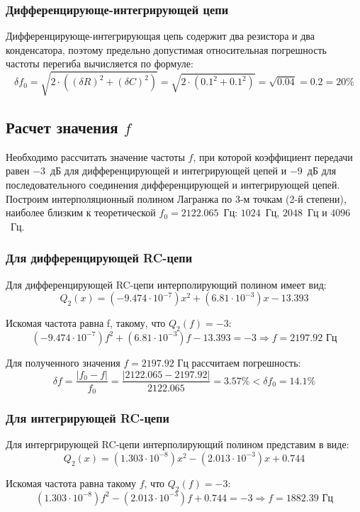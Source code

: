 \documentclass[a4paper,14pt]{extarticle}
\begin{document}
\subsubsection{Дифференцирующе-интегрирующей цепи}

Дифференцирующе-интегрирующая цепь содержит два резистора и два конденсатора, поэтому предельно допустимая относительная погрешность частоты перегиба вычисляется по формуле:
\[
\delta f_0 = \sqrt{2 \cdot ((\delta R)^2 + (\delta C)^2)} = \sqrt{2 \cdot (0.1^2 + 0.1^2)} = \sqrt{0.04} = 0.2 = 20 \%
\]

\subsection{Расчет значения $f$}

Необходимо рассчитать значение частоты $f$, при которой коэффициент передачи равен $-3$~дБ для дифференцирующей и интегрирующей цепей и $-9$~дБ для последовательного соединения дифференцирующей и интегрирующей цепей. Построим интерполяционный полином Лагранжа по 3-м точкам (2-й степени), наиболее близким к теоретической $f_0 = 2122.065$~Гц: $1024$~Гц, $2048$~Гц и $4096$~Гц.

\subsubsection{Для дифференцирующей RC-цепи}

Для дифференцирующей RC-цепи интерполирующий полином имеет вид:
\[
Q_2(x) = (-9.474 \cdot 10^{-7})x^2 + (6.81 \cdot 10^{-3})x - 13.393
\]

Искомая частота равна f, такому, что $Q_2(f) = -3$:
\[
(-9.474 \cdot 10^{-7})f^2 + (6.81 \cdot 10^{-3})f -13.393 = -3 \Rightarrow f = 2197.92 \text{ Гц}
\]

Для полученного значения $f = 2197.92$ Гц рассчитаем погрешность:
\[
\delta f = \frac{|f_0 - f|}{f_0} = \frac{|2122.065 - 2197.92|}{2122.065} = 3.57 \% < \delta f_0 = 14.1\%
\]

\subsubsection{Для интегрирующей RC-цепи}

Для интергрирующей RC-цепи интерполирующий полином представим в виде:
\[
Q_2(x) = (1.303 \cdot 10^{-8})x^2 - (2.013 \cdot 10^{-3})x + 0.744
\]

Искомая частота равна такому $f$, что $Q_2(f) = -3$:
\[
(1.303 \cdot 10^{-8})f^2 - (2.013 \cdot 10^{-3})f + 0.744 = -3 \Rightarrow f = 1882.39 \text{ Гц}
\]
\end{document}
